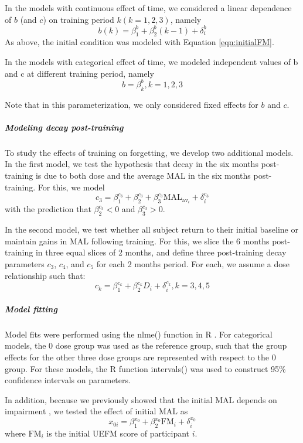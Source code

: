 In the models with continuous effect of time, we considered a linear dependence of $ b $ (and $ c $) on training period $ k (k=1,2,3) $, namely
\begin{equation}\label{eqn:timingcat}
	b(k) = \beta_1^b + \beta_2^b (k-1) + \delta_i^b
\end{equation}
As above, the initial condition was modeled with Equation \ref{eqn:initialFM}.  

In the models with categorical effect of time, we modeled independent values of b and c at different training period, namely
\begin{equation}
	b = \beta_k^b,  k = 1,2,3
\end{equation}

Note that in this parameterization, we only considered fixed effects for $ b $ and $ c $.

\subparagraph{Modeling decay post-training}
To study the effects of training on forgetting, we develop two additional models. 
In the first model, we test the hypothesis that decay in the six months post-training is due to both dose and the average MAL in the six months post-training. 
For this, we model 
\begin{equation}
	c_3 = \beta_1^{c_3} + \beta_2^{c_3} + \beta_3^{c_3}\text{MAL}_{\text{av}_i} + \delta_i^{c_3}
\end{equation}
with the prediction that $ \beta_2^{c_3} < 0 $ and $ \beta_3^{c_3} > 0 $.

In the second model, we test whether all subject return to their initial baseline or maintain gains in MAL following training.
For this, we slice the 6 months post-training in three equal slices of 2 months, and define three post-training decay parameters $ c_3 $, $ c_4 $, and $ c_5 $ for each 2 months period. 
For each, we assume a dose relationship such that: 
\begin{equation}
	c_k = \beta_1^{c_k} + \beta_2^{c_k} D_i + \delta_i^{c_k}, k = 3,4,5
\end{equation}

\subparagraph{Model fitting}
Model fits were performed using the \textsf{nlme()} function in \textsf{R} \cite{Pinheiro2015}.
For categorical models, the 0 dose group was used as the reference group, such that the group effects for the other three dose groups are represented with respect to the 0 group. 
For these models, the \textsf{R} function \textsf{intervals()} was used to construct 95\% confidence intervals on parameters.

In addition, because we previously showed that the initial MAL depends on impairment \cite{Winstein2014}, we tested the effect of initial MAL as 
\begin{equation}\label{eqn:initialFM}
	x_{0i} = \beta_1^{x_0} + \beta_2^{x_0} \text{FM}_i + \delta_i^{x_0}
\end{equation}
where $ \text{FM}_i $ is the initial UEFM score of participant $ i $.

